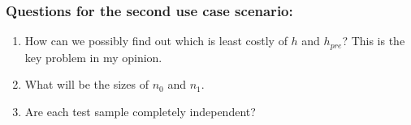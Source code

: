 \documentclass{article}
\theoremstyle{theorem}
\theoremstyle{definition}
\begin{document}
\subsubsection*{Questions for the second use case scenario: }
\begin{enumerate}
\item How can we possibly find out which is least costly of $h$ and $h_{pre}$? This is the key problem in my opinion.
\item What will be the sizes of $n_0$ and $n_1$.
\item Are each test sample completely independent?
\end{enumerate}





%
%
%
%
%
%
%
%
%
\end{document}
